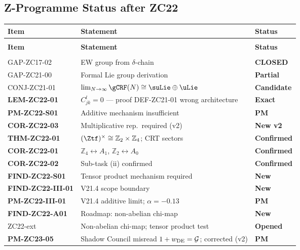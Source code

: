 \documentclass[12pt, a4paper]{article}
\begin{document}
\subsection{Z-Programme Status after ZC22}
\label{zc22:sec:status}

\begin{formalbox}[title={Z-Programme Status after TASK-ZC22}]
{\small
\setlength{\LTpre}{4pt}
\setlength{\LTpost}{4pt}
\renewcommand{\arraystretch}{1.30}
\begin{longtable}{>{\raggedright\arraybackslash}p{3.6cm}
                  >{\raggedright\arraybackslash}p{5.8cm}
                  >{\centering\arraybackslash}p{2.4cm}}
\toprule
\textbf{Item} & \textbf{Statement} & \textbf{Status} \\
\midrule
\endfirsthead
\multicolumn{3}{l}{\small\textit{(continued)}}\\[4pt]
\toprule
\textbf{Item} & \textbf{Statement} & \textbf{Status} \\
\midrule
\endhead
\midrule
\multicolumn{3}{r}{\small\textit{(continues)}}\\
\endfoot
\bottomrule
\endlastfoot
GAP-ZC17-02  & EW group from $\delta$-chain & \textbf{CLOSED} \\
GAP-ZC21-00  & Formal Lie group derivation & \textbf{Partial} \\
CONJ-ZC21-01 & $\lim_{N\to\infty}\gCRF(N)\cong\suLie\oplus\uLie$ & \textbf{Candidate} \\
\midrule
\textbf{LEM-ZC22-01} & $C_{jk}^l = 0$ --- proof DEF-ZC21-01 wrong architecture & \textbf{Exact} \\
\textbf{PM-ZC22-S01} & Additive mechanism insufficient & \textbf{PM} \\
\textbf{COR-ZC22-03} & Multiplicative rep.\ required (v2) & \textbf{New v2} \\
\textbf{THM-ZC22-01} & $(\Ztf)^\times\cong\mathbb{Z}_2\times\mathbb{Z}_4$; CRT sectors & \textbf{Confirmed} \\
\textbf{COR-ZC22-01} & $\mathbb{Z}_4\leftrightarrow A_1$, $\mathbb{Z}_2\leftrightarrow A_0$ & \textbf{Confirmed} \\
\textbf{COR-ZC22-02} & Sub-task (ii) confirmed & \textbf{Confirmed} \\
\textbf{FIND-ZC22-S01} & Tensor product mechanism required & \textbf{New} \\
\textbf{FIND-ZC22-III-01} & V21.4 scope boundary & \textbf{New} \\
\textbf{PM-ZC22-III-01} & V21.4 additive limit; $\alpha=-0.13$ & \textbf{PM} \\
\textbf{FIND-ZC22-A01} & Roadmap: non-abelian chi-map & \textbf{New} \\
\midrule
ZC22-ext     & Non-abelian chi-map; tensor product test & \textbf{Opened} \\
\midrule
\textbf{PM-ZC23-05} & Shadow Council misread $1+w_{\rm DE}=\mathcal{G}$; corrected (v2) & \textbf{PM} \\
\end{longtable}
}
\end{formalbox}
\end{document}
